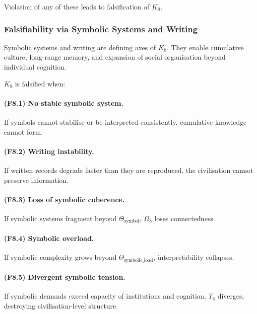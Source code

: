 Violation of any of these leads to falsification of $K_8$.



\subsubsection{Falsifiability via Symbolic Systems and Writing}

Symbolic systems and writing are defining axes of $K_8$.
They enable cumulative culture, long-range memory,
and expansion of social organisation beyond individual cognition.

$K_8$ is falsified when:

\paragraph{(F8.1) No stable symbolic system.}
If symbols cannot stabilise or be interpreted consistently,
cumulative knowledge cannot form.

\paragraph{(F8.2) Writing instability.}
If written records degrade faster than they are reproduced,
the civilisation cannot preserve information.

\paragraph{(F8.3) Loss of symbolic coherence.}
If symbolic systems fragment beyond $\Theta_{\mathrm{symbol}}$,
$\Omega_8$ loses connectedness.

\paragraph{(F8.4) Symbolic overload.}
If symbolic complexity grows beyond $\Theta_{\mathrm{symbolic\_load}}$,
interpretability collapses.

\paragraph{(F8.5) Divergent symbolic tension.}
If symbolic demands exceed capacity of institutions and cognition,
$T_8$ diverges, destroying civilisation-level structure.



